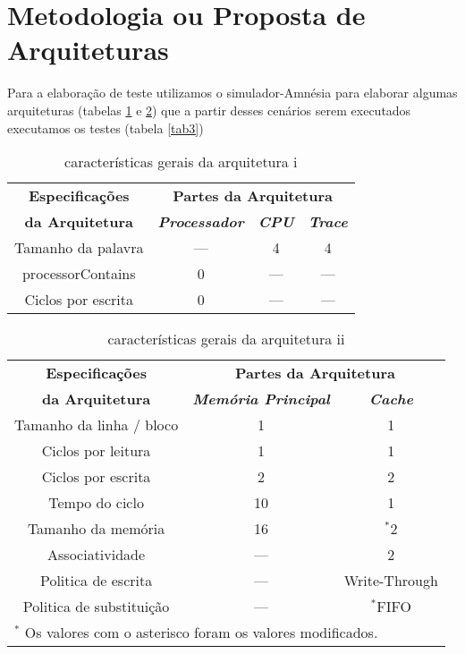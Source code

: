 \documentclass[conference]{IEEEtran}
\begin{document}
\section{Metodologia ou Proposta de Arquiteturas}

  Para a elaboração de teste utilizamos o simulador-Amnésia para elaborar algumas
arquiteturas (tabelas \ref{tab1} e \ref{tab2}) que a partir desses cenários serem executados
executamos os testes (tabela \ref{tab3})
\begin{table}[H]
  \caption{características gerais da arquitetura i}
    \centering
      \begin{tabular}{|c|c|c|c|}
          \hline
          \textbf{Especificações} & \multicolumn{3}{|c|}{\textbf{Partes da Arquitetura}} \\
          \cline{2-4} 
          \textbf{da Arquitetura} & \textbf{\textit{Processador}}& \textbf{\textit{CPU}}& \textbf{\textit{Trace}} \\
          \hline
          Tamanho da palavra & --- & 4 & 4 \\
          \hline
          processorContains & 0 & --- & --- \\
          \hline
          Ciclos por escrita & 0 & --- & --- \\
          \hline
      \end{tabular}
      \label{tab1}
\end{table}

\begin{table}[H]
  \caption{características gerais da arquitetura ii}
  \centering
      \begin{tabular}{|c|c|c|}
          \hline
          \textbf{Especificações} & \multicolumn{2}{|c|}{\textbf{Partes da Arquitetura}} \\
          \cline{2-3} 
          \textbf{da Arquitetura} & \textbf{\textit{Memória Principal}}& \textbf{\textit{Cache}} \\
          \hline
          Tamanho da linha / bloco & 1 & 1  \\
          \hline
          Ciclos por leitura & 1 & 1  \\
          \hline
          Ciclos por escrita & 2 & 2  \\
          \hline
          Tempo do ciclo & 10 & 1  \\
          \hline
          Tamanho da memória & 16 & {$^{\mathrm{*}}$}2  \\
          \hline
          Associatividade & --- & 2  \\
          \hline
          Politica de escrita & --- & Write-Through  \\
          \hline
          Politica de substituição & --- & {$^{\mathrm{*}}$}FIFO  \\
          \hline
          \multicolumn{3}{l}{$^{\mathrm{*}}$ Os valores com o asterisco foram os valores modificados.}
      \end{tabular}
      \label{tab2}
\end{table}
 
\end{document}

